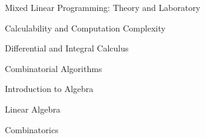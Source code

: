 

\vspace{1 mm}

\begin{cvtalks}
  \cvtalk
  {Mixed Linear Programming: Theory and Laboratory}
  {}
  {
    \begin{cvitems}
      \item {} \hfill {} 
    \end{cvitems}
  }
  \cvtalk
  {Calculability and Computation Complexity}
  {}
  {
    \begin{cvitems}
      \item {} \hfill {} 
    \end{cvitems}
  }  
  \cvtalk
  {Differential and Integral Calculus}
  {}
  {
    \begin{cvitems}
      \item {} \hfill {} 
    \end{cvitems}
  }
  \cvtalk
  {Combinatorial Algorithms}
  {}
  {
    \begin{cvitems}
      \item {} \hfill {} 
    \end{cvitems}
  }
  \cvtalk
  {Introduction to Algebra}
  {}
  {
    \begin{cvitems}
      \item {} \hfill {} 
    \end{cvitems}
  }
  \cvtalk
  {Linear Algebra}
  {}
  {
    \begin{cvitems}
      \item {} \hfill {} 
    \end{cvitems}
  }  
  \cvtalk
  {Combinatorics}
  {}
  {
    \begin{cvitems}
      \item {} \hfill {} 
    \end{cvitems}
  }

  
  
\end{cvtalks}

